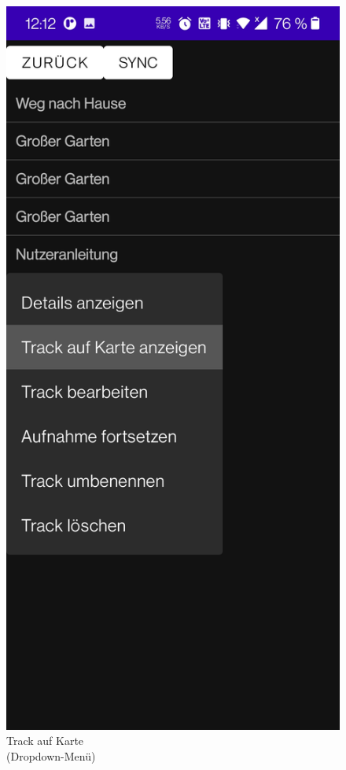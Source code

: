 \documentclass{article}
\begin{document}
	\begin{figure}[H]
		\captionsetup{justification=centering}
		  \includegraphics[scale=0.15]{6_anzeigen.jpg}
		  \centering
		  \caption{Track auf Karte \\(Dropdown-Menü)}

\end{figure}
\end{document}
